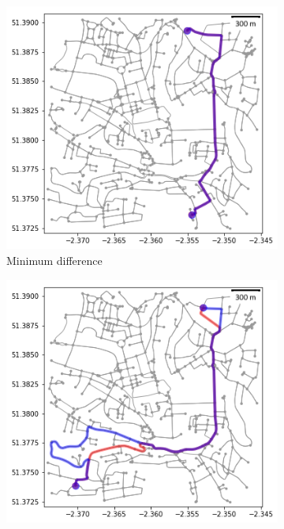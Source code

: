 \documentclass[11pt,twosided,a4paper]{report}
\begin{document}
\begin{figure}[!tb]
    \centering
    \begin{minipage}{1\linewidth}
            \begin{subfigure}[t]{.5\linewidth}
                \includegraphics[width=\textwidth]{images/health_optimal_route_min}
                \caption{Minimum difference}
                \label{fig:route_min}
            \end{subfigure}
            \begin{subfigure}[t]{.5\linewidth}
            	\includegraphics[width=\textwidth]{images/health_optimal_route_median}

\end{subfigure}
\end{minipage}
\end{figure}
\end{document}
